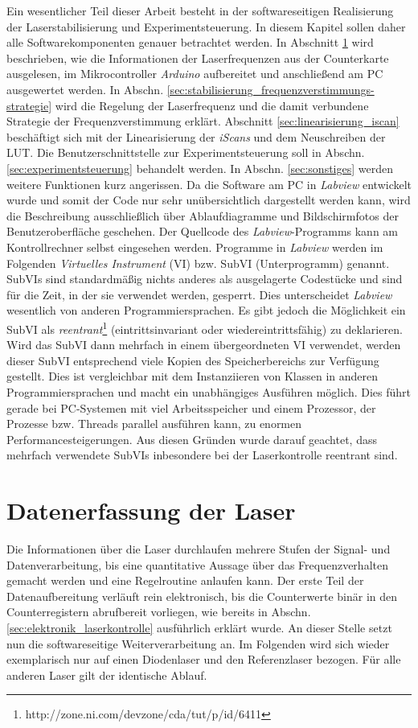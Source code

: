 Ein wesentlicher Teil dieser Arbeit besteht in der softwareseitigen Realisierung
der Laserstabilisierung und Experimentsteuerung. In diesem Kapitel sollen daher
alle Softwarekomponenten genauer betrachtet werden. In Abschnitt
\ref{sec:datenerfassung_der_laser} wird beschrieben, wie die Informationen
der Laserfrequenzen aus der Counterkarte ausgelesen, im
Mikrocontroller \textit{Arduino} aufbereitet und anschließend am PC ausgewertet
werden. In Abschn. \ref{sec:stabilisierung_frequenzverstimmungs-strategie} wird die Regelung
der Laserfrequenz und die damit verbundene Strategie der Frequenzverstimmung
erklärt. Abschnitt \ref{sec:linearisierung_iscan} beschäftigt sich mit der
Linearisierung der \textit{iScans} und dem Neuschreiben der LUT. Die
Benutzerschnittstelle zur Experimentsteuerung soll in Abschn.
\ref{sec:experimentsteuerung} behandelt werden. In Abschn. \ref{sec:sonstiges}
werden weitere Funktionen kurz angerissen. Da die Software am PC in
\textit{Labview} entwickelt wurde und somit der Code nur sehr unübersichtlich
dargestellt werden kann, wird die Beschreibung ausschließlich über
Ablaufdiagramme und Bildschirmfotos der Benutzeroberfläche geschehen. Der
Quellcode des \textit{Labview}-Programms kann am Kontrollrechner selbst eingesehen
werden. Programme in \textit{Labview} werden im Folgenden \textit{Virtuelles
Instrument} (VI) bzw. SubVI (Unterprogramm) genannt. SubVIs sind standardmäßig
nichts anderes als ausgelagerte Codestücke und sind für die Zeit, in der sie
verwendet werden, gesperrt. Dies unterscheidet \textit{Labview} wesentlich von
anderen Programmiersprachen. Es gibt jedoch die Möglichkeit ein SubVI als
\textit{reentrant}\footnote{http://zone.ni.com/devzone/cda/tut/p/id/6411}
(eintrittsinvariant oder wiedereintrittsfähig) zu deklarieren. Wird das SubVI
dann mehrfach in einem übergeordneten VI verwendet, werden dieser SubVI
entsprechend viele Kopien des Speicherbereichs zur Verfügung gestellt. Dies ist vergleichbar mit dem Instanziieren von Klassen
in anderen Programmiersprachen und macht ein unabhängiges Ausführen möglich.
Dies führt gerade bei PC-Systemen mit viel Arbeitsspeicher und einem Prozessor, der
Prozesse bzw. Threads parallel ausführen kann, zu enormen
Performancesteigerungen.
Aus diesen Gründen wurde darauf geachtet, dass mehrfach verwendete SubVIs
inbesondere bei der Laserkontrolle reentrant sind.

\section{Datenerfassung der Laser}\label{sec:datenerfassung_der_laser}
Die Informationen über die Laser durchlaufen mehrere Stufen der Signal- und
Datenverarbeitung, bis eine quantitative Aussage über das Frequenzverhalten
gemacht werden und eine Regelroutine anlaufen kann. Der erste Teil der
Datenaufbereitung verläuft rein elektronisch, bis die Counterwerte binär in
den Counterregistern abrufbereit vorliegen, wie bereits in Abschn.
\ref{sec:elektronik_laserkontrolle} ausführlich erklärt wurde. An dieser Stelle
setzt nun die softwareseitige Weiterverarbeitung an. Im Folgenden wird sich
wieder exemplarisch nur auf einen Diodenlaser und den Referenzlaser bezogen.
Für alle anderen Laser gilt der identische Ablauf.

